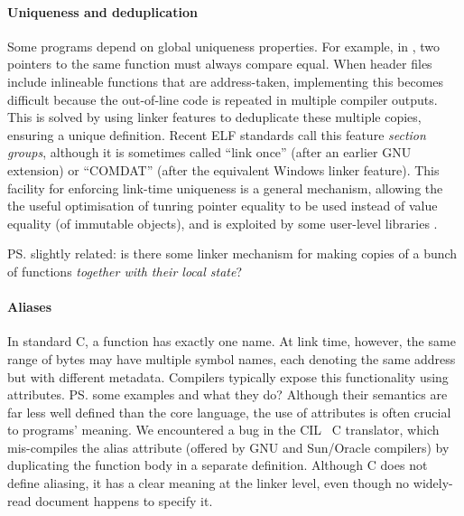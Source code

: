 \paragraph{Uniqueness and deduplication}
Some programs depend on global uniqueness properties. 
For example, in \Cplusplus{}, two pointers to the same function
must always compare equal.
When header files include inlineable functions that are address-taken, 
implementing this becomes difficult because the
out-of-line code is repeated in multiple compiler outputs.
This is solved by using linker features 
to deduplicate these multiple copies, ensuring a unique definition.
Recent ELF standards call this feature \emph{section groups},
although it is sometimes called ``link once'' (after an earlier GNU extension) or
``COMDAT'' (after the equivalent Windows linker feature).
This facility for enforcing link-time uniqueness 
is a general mechanism, allowing the 
the useful optimisation of tunring pointer equality to be used instead of value equality 
(of immutable objects),
and is exploited by some user-level libraries \citep{kell_dynamic_2015}.



\ps{slightly related: is there some linker mechanism for making copies
  of a bunch of functions \emph{together with their local state}?}

\paragraph{Aliases}
In standard C, a function has exactly one name. 
At link time, however, the same range of bytes may have multiple symbol names, 
each denoting the same address but with different metadata.
Compilers typically expose this functionality using attributes.
\ps{some examples and what they do?}
Although their semantics are far less well defined than the core language,
the use of attributes is often crucial to programs' meaning.
We encountered a bug in the CIL~\cite{necula-cil-2002} C translator, which mis-compiles the \textsf{alias} attribute
(offered by GNU and Sun/Oracle compilers)
by duplicating the function body in a separate definition.
Although C does not define aliasing, 
it has a clear meaning at the linker level,
even though no widely-read document happens to specify it.



